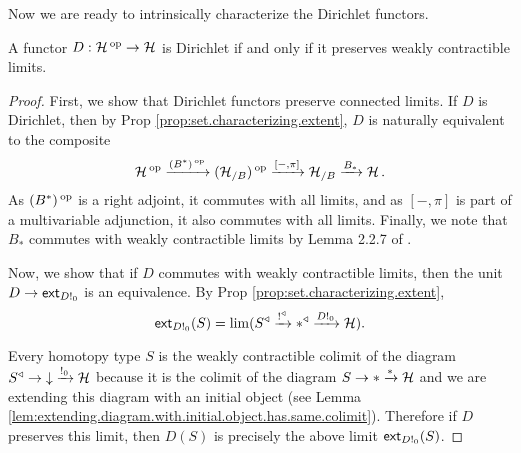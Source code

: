 Now we are ready to intrinsically characterize the Dirichlet functors.
\begin{thm}
A functor $D : \operatorname{\mathcal{H}}\operatorname{^\textnormal{op}} \to \operatorname{\mathcal{H}}$ is Dirichlet if and only if it preserves
weakly contractible limits. 
\end{thm}
\begin{proof}
First, we show that Dirichlet functors preserve connected limits. If $D$ is
Dirichlet, then by Prop \ref{prop:set.characterizing.extent}, $D$ is naturally
equivalent to the composite
$$\operatorname{\mathcal{H}}\operatorname{^\textnormal{op}} \xrightarrow{(B^{\ast})\operatorname{^\textnormal{op}}} (\operatorname{\mathcal{H}}_{/B})\operatorname{^\textnormal{op}} \xrightarrow{[-, \pi]} \operatorname{\mathcal{H}}_{/B}
\xrightarrow{B_\ast} \operatorname{\mathcal{H}}.$$
As $(B^{\ast})\operatorname{^\textnormal{op}}$ is a right adjoint, it commutes with all limits, and as $[-,\pi]$
is part of a multivariable adjunction, it also commutes with all limits.
Finally, we note that $B_{\ast}$ commutes with weakly contractible limits by
Lemma 2.2.7 of \cite{GHK:Analytic.Monads}.

Now, we show that if $D$ commutes with weakly contractible limits, then the unit
$D \to \operatorname{\mathsf{{ext}}}_{D!_0}$ is an equivalence. By Prop
\ref{prop:set.characterizing.extent}, 
  $$\operatorname{\mathsf{{ext}}}_{D!_0}(S) = \lim(S^{\triangleleft} \xrightarrow{!^{\triangleleft}} \ast^{\triangleleft}
  \xrightarrow{D!_0} \operatorname{\mathcal{H}}).$$
  
Every homotopy type $S$ is the weakly contractible colimit of the diagram $S^{\triangleleft} \to
\mathbin{\downarrow} \xrightarrow{!_0} \operatorname{\mathcal{H}}$ because it is the colimit of the diagram $S \to \ast
\xrightarrow{\ast} \operatorname{\mathcal{H}}$ and we are extending this diagram with an initial object (see
Lemma \ref{lem:extending.diagram.with.initial.object.has.same.colimit}). Therefore if $D$ preserves this limit, then
$D(S)$ is precisely the above limit $\operatorname{\mathsf{{ext}}}_{D!_0}(S)$.
\end{proof}


